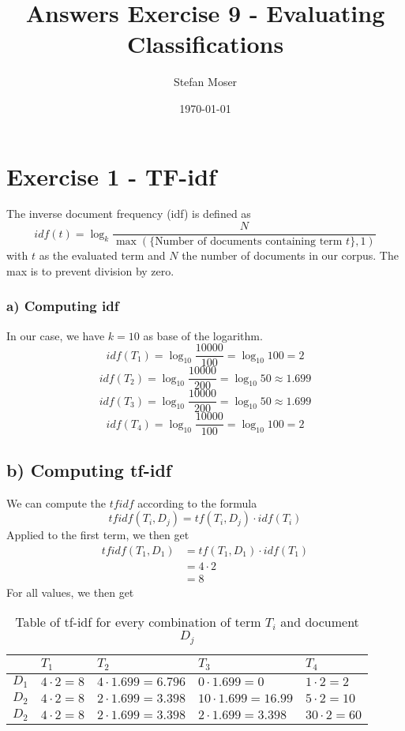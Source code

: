 \documentclass[11pt]{article}
\title{\textbf{Answers Exercise 9 - Evaluating Classifications}}
\author{Stefan Moser}
\date{\today}
\begin{document}
\maketitle

\section*{Exercise 1 - TF-idf}
The inverse document frequency (idf) is defined as
\begin{equation}
	idf(t) = \log_k \frac{N}{  \max(\{\text{Number of documents containing term } t \}, 1) }
\end{equation}
with $t$ as the evaluated term and $N$ the number of documents in our corpus. The max is
to prevent division by zero.
\subsubsection*{a) Computing idf}
In our case, we have $k=10$ as base of the logarithm.
\begin{equation}
	idf(T_1) = \log_{10} \frac{10000}{100} = \log_{10} 100 = 2
\end{equation}
\begin{equation}
	idf(T_2) = \log_{10} \frac{10000}{200} = \log_{10} 50 \approx 1.699
\end{equation}
\begin{equation}
	idf(T_3) = \log_{10} \frac{10000}{200} = \log_{10} 50 \approx 1.699
\end{equation}
\begin{equation}
	idf(T_4) = \log_{10} \frac{10000}{100} = \log_{10} 100 = 2
\end{equation}
\subsection*{b) Computing tf-idf}
We can compute the $tfidf$ according to the formula
\begin{equation}
		tfidf(T_i, D_j) = tf(T_i, D_j) \cdot idf(T_i) 
\end{equation}
Applied to the first term, we then get
\begin{align}
	tfidf(T_1, D_1) &= tf(T_1, D_1) \cdot idf(T_1) \\
					&= 4 \cdot 2 \\
					&= 8
\end{align}
For all values, we then get
\begin{table}[h]
\begin{tabular}{|l|l|l|l|l|}
\hline
	\backslashbox{Documents}{Terms} & $T_1$ & $T_2$ & $T_3$ & $T_4$\\
\hline
	$D_1$ & $4 \cdot 2 = 8$ & $4 \cdot 1.699 = 6.796$  & $0 \cdot 1.699 = 0$ & $1 \cdot 2 = 2$\\
\hline
	$D_2$ & $4 \cdot 2 = 8$  & $2 \cdot 1.699 = 3.398$ & $10 \cdot 1.699 = 16.99 $ & $5 \cdot 2 = 10$\\
\hline
	$D_2$ & $4 \cdot 2 = 8$  & $2 \cdot 1.699 = 3.398$ & $2 \cdot 1.699 = 3.398$ & $30 \cdot 2 = 60$\\
\hline
\end{tabular}
\caption{Table of tf-idf for every combination of term $T_i$ and document $D_j$}
\end{table}
\end{document}

